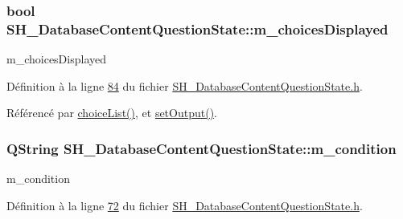 \hypertarget{classSH__DatabaseContentQuestionState_aff4d8f402d9299029038ec4f21271b2b}{
\subsubsection[{m\-\_\-choices\-Displayed}]{\setlength{\rightskip}{0pt plus 5cm}bool S\-H\-\_\-\-Database\-Content\-Question\-State\-::m\-\_\-choices\-Displayed\hspace{0.3cm}{\ttfamily [private]}}}\label{classSH__DatabaseContentQuestionState_aff4d8f402d9299029038ec4f21271b2b}


m\-\_\-choices\-Displayed 



Définition à la ligne \hyperlink{SH__DatabaseContentQuestionState_8h_source_l00084}{84} du fichier \hyperlink{SH__DatabaseContentQuestionState_8h_source}{S\-H\-\_\-\-Database\-Content\-Question\-State.\-h}.



Référencé par \hyperlink{classSH__DatabaseContentQuestionState_a14ca81b7c20c9e20e9d9e327b513f6ec}{choice\-List()}, et \hyperlink{classSH__DatabaseContentQuestionState_aaec6c7f8bc78c6beb7447fc41ffe3875}{set\-Output()}.

\hypertarget{classSH__DatabaseContentQuestionState_aaffd467fccc69b6d46194f04831a1edc}{
\subsubsection[{m\-\_\-condition}]{\setlength{\rightskip}{0pt plus 5cm}Q\-String S\-H\-\_\-\-Database\-Content\-Question\-State\-::m\-\_\-condition\hspace{0.3cm}{\ttfamily [private]}}}\label{classSH__DatabaseContentQuestionState_aaffd467fccc69b6d46194f04831a1edc}


m\-\_\-condition 



Définition à la ligne \hyperlink{SH__DatabaseContentQuestionState_8h_source_l00072}{72} du fichier \hyperlink{SH__DatabaseContentQuestionState_8h_source}{S\-H\-\_\-\-Database\-Content\-Question\-State.\-h}.



